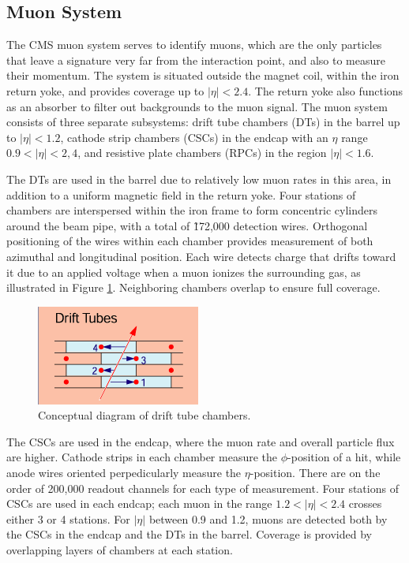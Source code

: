 \subsection{Muon System}
\label{exp:muons}
The CMS muon system serves to identify muons, 
which are the only particles that leave a signature 
very far from the interaction point,
and also to measure their momentum.  
The system is situated outside the magnet coil, 
within the iron return yoke, 
and provides coverage up to $|\eta| < 2.4$.  
The return yoke also functions as an absorber 
to filter out backgrounds to the muon signal.  
The muon system consists of three separate subsystems: 
drift tube chambers (DTs) in the barrel up to $|\eta| < 1.2$, 
cathode strip chambers (CSCs) in the endcap 
with an $\eta$ range $ 0.9 < |\eta| < 2,4$, 
and resistive plate chambers (RPCs) %
in the region $ |\eta| < 1.6$.  

The DTs are used in the barrel due to 
relatively low muon rates in this area, 
in addition to a uniform magnetic field in the 
return yoke.  
Four stations of chambers are interspersed 
within the iron frame to form %
concentric cylinders around the beam pipe, 
with a total of \~172,000 detection wires.  
Orthogonal positioning of the wires 
within each chamber provides measurement of 
both azimuthal and longitudinal position.  
Each wire detects charge that drifts toward it 
due to an applied voltage when a muon ionizes 
the surrounding gas, as illustrated in 
Figure \ref{fig:DTconcept}.  
Neighboring chambers overlap 
to ensure full coverage.  

 \begin{figure}[htb]
  \begin{center}
    \includegraphics[]{Figures/muon-DT-concept.png}
  \end{center}
  \caption[\fixspacing Conceptual diagram of drift tube chambers]
	  {\fixspacing Conceptual diagram of drift tube chambers.}
  \label{fig:DTconcept}
 \end{figure}

The CSCs are used in the endcap, 
where the muon rate and overall particle flux 
are higher.  
Cathode strips in each chamber 
measure the $\phi$-position of a hit, 
while anode wires oriented perpedicularly measure 
the $\eta$-position.  
There are on the order of 200,000 readout channels 
for each type of measurement.  
Four stations of CSCs are used in each endcap; 
each muon in the range $1.2 < |\eta| <2.4$ crosses either 
3 or 4 stations.  
For $|\eta|$ between 0.9 and 1.2, muons are detected 
both by the CSCs in the endcap and the DTs in the barrel.  
Coverage is provided by overlapping layers of chambers 
at each station.  

